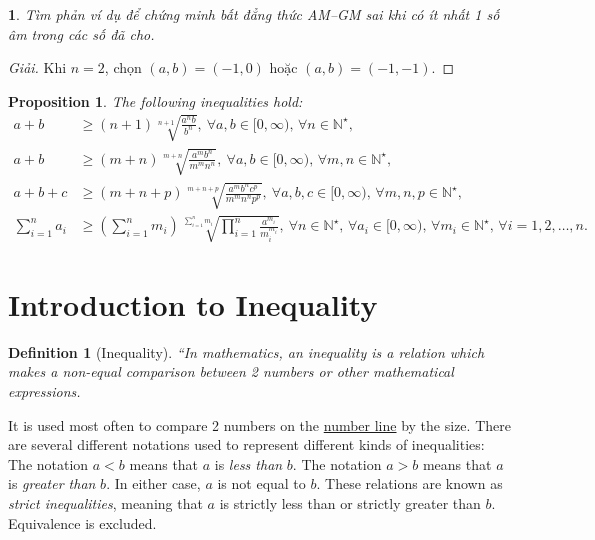\documentclass{article}
\newtheorem{baitoan}{}
\newtheorem{definition}{Definition}
\newtheorem{proposition}{Proposition}
\begin{document}
\begin{baitoan}
	Tìm phản ví dụ để chứng minh bất đẳng thức AM--GM sai khi có ít nhất 1 số âm trong các số đã cho.
\end{baitoan}

\begin{proof}[Giải]
	Khi $n = 2$, chọn $(a,b) = (-1,0)$ hoặc $(a,b) = (-1,-1)$.
\end{proof}

\begin{proposition}
	The following inequalities hold:
	\begin{align}
		a + b&\ge(n + 1)\sqrt[n + 1]{\frac{a^nb}{b^n}},\ \forall a,b\in[0,\infty),\,\forall n\in\mathbb{N}^\star,\\
		a + b&\ge(m + n)\sqrt[m + n]{\frac{a^mb^n}{m^mn^n}},\ \forall a,b\in[0,\infty),\,\forall m,n\in\mathbb{N}^\star,\\
		a + b + c&\ge(m + n + p)\sqrt[m + n+ p]{\frac{a^mb^nc^p}{m^mn^np^p}},\ \forall a,b,c\in[0,\infty),\,\forall m,n,p\in\mathbb{N}^\star,\\
		\sum_{i=1}^n a_i&\ge\left(\sum_{i=1}^n m_i\right)\sqrt[\sum_{i=1}^n m_i]{\prod_{i=1}^n \frac{a^{m_i}}{m_i^{m_i}}},\ \forall n\in\mathbb{N}^\star,\,\forall a_i\in[0,\infty),\,\forall m_i\in\mathbb{N}^\star,\,\forall i = 1,2,\ldots,n.
	\end{align}
\end{proposition}



\section{Introduction to Inequality}

\begin{definition}[Inequality]
	``In mathematics, an \emph{inequality} is a relation which makes a non-equal comparison between 2 numbers or other mathematical expressions.
\end{definition}
It is used most often to compare 2 numbers on the \href{https://en.wikipedia.org/wiki/Number_line}{number line} by the size. There are several different notations used to represent different kinds of inequalities: The notation $a < b$ means that $a$ is \textit{less than} $b$. The notation $a > b$ means that $a$ is \textit{greater than} $b$. In either case, $a$ is not equal to $b$. These relations are known as \textit{strict inequalities}, meaning that $a$ is strictly less than or strictly greater than $b$. Equivalence is excluded.
\end{document}
